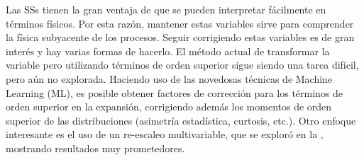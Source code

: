 Las \acp{SS} tienen la gran ventaja de que se pueden interpretar fácilmente en términos físicos. Por esta razón, mantener estas variables sirve para comprender la física subyacente de los procesos. Seguir corrigiendo estas variables es de gran interés y hay varias formas de hacerlo. El método actual de transformar la variable pero utilizando términos de orden superior sigue siendo una tarea difícil, pero aún no explorada. Haciendo uso de las novedosas técnicas de Machine Learning (ML), es posible obtener factores de corrección para los términos de orden superior en la expansión, corrigiendo además los momentos de orden superior de las distribuciones (asimetría estadística, curtosis, etc.). Otro enfoque interesante es el uso de un re-escaleo multivariable, que se exploró en la , mostrando resultados muy prometedores.